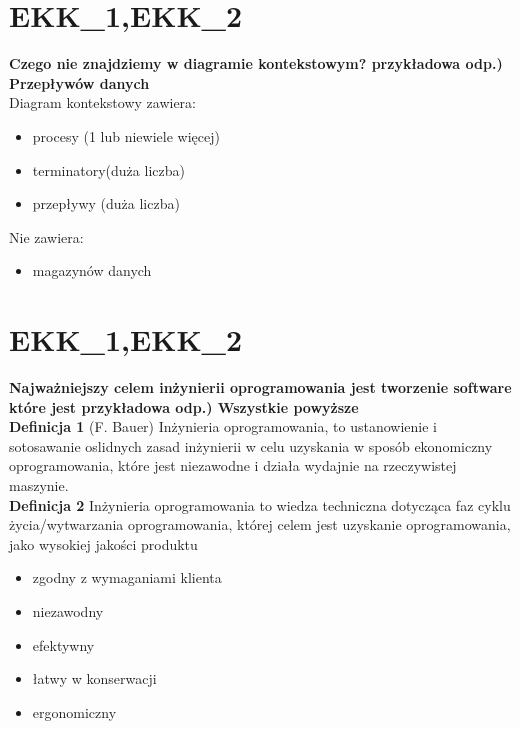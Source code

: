 \section{EKK\_1,EKK\_2}
\textbf{Czego nie znajdziemy w diagramie kontekstowym?
przykładowa odp.) Przepływów danych
}
\\
Diagram kontekstowy zawiera:
\begin{itemize}
\item procesy (1 lub niewiele więcej)
\item terminatory(duża liczba)
\item przepływy (duża liczba)
\end{itemize}

Nie zawiera:
\begin{itemize}
\item magazynów danych
\end{itemize}

\section{EKK\_1,EKK\_2}
\textbf{Najważniejszy celem inżynierii oprogramowania jest tworzenie software które jest
przykładowa odp.) Wszystkie powyższe}\\
\textbf{Definicja 1} (F. Bauer) Inżynieria oprogramowania, to ustanowienie i sotosawanie oslidnych zasad inżynierii w celu uzyskania w sposób ekonomiczny oprogramowania, które jest niezawodne i działa wydajnie na rzeczywistej maszynie.\\
\textbf{Definicja 2} Inżynieria oprogramowania to wiedza techniczna dotycząca faz cyklu życia/wytwarzania oprogramowania, której celem jest uzyskanie oprogramowania, jako wysokiej jakości produktu
\begin{itemize}
\item zgodny z wymaganiami klienta
\item niezawodny
\item efektywny
\item łatwy w konserwacji
\item ergonomiczny
\end{itemize}

